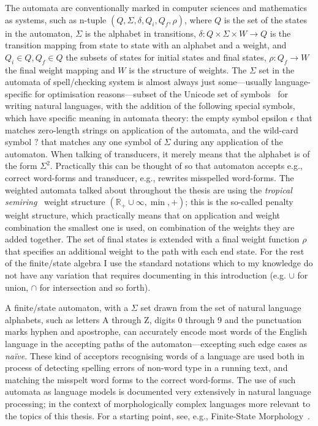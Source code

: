\documentclass[officiallayout]{unihelcompling}
\begin{document}
The automata are conventionally marked in computer sciences and mathematics as
systems, such as n-tuple $(Q, \Sigma, \delta, Q_i, Q_f, \rho)$, where $Q$ is
the set of the states in the automaton, $\Sigma$ is the alphabet in
transitions, $\delta: Q \times \Sigma \times W \rightarrow Q$ is the transition
mapping from state to state with an alphabet and a weight, and $Q_i \in Q, Q_f
\in Q$ the subsets of states for initial states and final states, $\rho: Q_f
\rightarrow W$ the final weight mapping and $W$ is the structure of weights.
The $\Sigma$ set in the automata of spell\-/checking system is almost always
just some---usually language-specific for optimisation reasons---subset of the
Unicode set of symbols~\citep{unicode} for writing natural languages, with the
addition of the following special symbols, which have specific meaning in
automata theory: the empty symbol epsilon $\epsilon$ that matches zero-length
strings on application of the automata, and the wild-card symbol $?$ that
matches any one symbol of $\Sigma$ during any application of the automaton.
When talking of transducers, it merely means that the alphabet is of the form
$\Sigma^2$. Practically this can be thought of so that automaton accepts e.g.,
correct word-forms and transducer, e.g., rewrites misspelled word-forms.  The
weighted automata talked about throughout the thesis are using the
\emph{tropical semiring}~\cite{mohri1997finitestate} weight structure
$(\mathbb{R}_+ \cup \infty, \min, +)$; this is the so-called penalty weight
structure, which practically means that on application and weight combination
the smallest one is used, on combination of the weights they are added
together. The set of final states is extended with a final weight function
$\rho$ that specifies an additional weight to the path with each end state. For
the rest of the finite\-/state algebra I use the standard notations which to my
knowledge do not have any variation that requires documenting in this
introduction (e.g.  $\cup$ for union, $\cap$ for intersection and so forth).

A finite\-/state automaton, with a $\Sigma$ set drawn from the set of natural
language alphabets, such as letters A through Z, digits 0 through 9 and the
punctuation marks hyphen and apostrophe, can accurately encode most words of
the English language in the accepting paths of the automaton---excepting such
edge cases as \emph{naïve}. These kind of acceptors recognising words of a language are used both in process
of detecting spelling errors of non-word type in a running text, and matching
the misspelt word forms to the correct word-forms. The use of such automata as
language models is documented very extensively in natural language processing;
in the context of morphologically complex languages more relevant to the topics of
this thesis. For a starting point, see, e.g., Finite-State Morphology~\citep{beesley2003finite,beesley2004morphological}.
\end{document}
